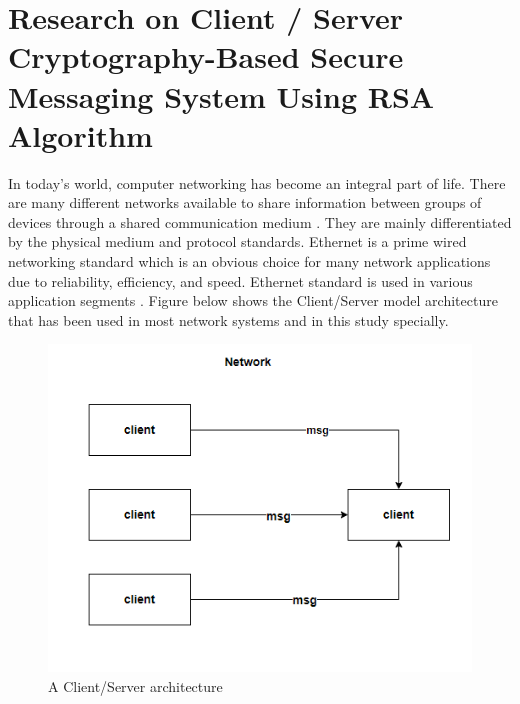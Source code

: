 \section{Research on Client / Server Cryptography-Based Secure Messaging
  System Using RSA Algorithm }
In today’s world, computer networking has become an
integral part of life. There are many different networks
available to share information between groups of devices
through a shared communication medium . They are
mainly differentiated by the physical medium and protocol
standards. Ethernet is a prime wired networking standard
which is an obvious choice for many network applications
due to reliability, efficiency, and speed. Ethernet standard is
used in various application segments . Figure below
shows the Client/Server model architecture that has been
used in most network systems and in this study specially.
\begin{figure}[H]
	\centering
	\includegraphics[width=160mm]{images/clientserver.png}
	\caption{A Client/Server architecture}
	\label{figclientserver} %
\end{figure}

